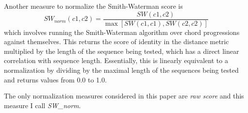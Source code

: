 Another measure to normalize the Smith-Waterman score is
\[ SW_{norm}(c1,c2)=\frac{SW(c1,c2)}{\max [SW(c1,c1), SW(c2,c2)]} \]
which involves running the Smith-Waterman algorithm over chord progressions against themselves. This returns the score of identity in the distance metric multiplied by the length of the sequence being tested, which has a direct linear correlation with sequence length. Essentially, this is linearly equivalent to a normalization by dividing by the maximal length of the sequences being tested and returns values from 0.0 to 1.0.

The only normalization measures considered in this paper are \textit{raw score} and this measure I call \textit{SW_{norm}}.












